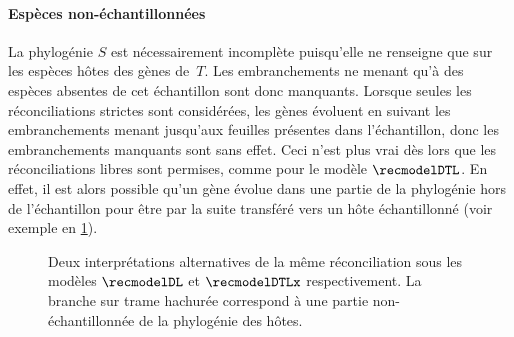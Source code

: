 {%

\paragraph{Espèces non-échantillonnées~\textup{\parencite{Szoelloesi2013LateralGeneTransfer,Weiner2021ImprovedDuplicationTransfer}}}
La phylogénie \(S\) est nécessairement incomplète puisqu’elle ne renseigne que sur les espèces hôtes des gènes de~\(T\).
Les embranchements ne menant qu’à des espèces absentes de cet échantillon sont donc manquants.
Lorsque seules les réconciliations strictes sont considérées, les gènes évoluent en suivant les embranchements menant jusqu’aux feuilles présentes dans l’échantillon, donc les embranchements manquants sont sans effet.
Ceci n’est plus vrai dès lors que les réconciliations libres sont permises, comme pour le modèle \(\recmodelDTL\).
En effet, il est alors possible qu’un gène évolue dans une partie de la phylogénie hors de l’échantillon pour être par la suite transféré vers un hôte échantillonné (voir exemple en \cref{figure:rec-dtlx}).

\begin{figure}[htb]
    \capstart
    \centering
    
    \caption{
        Deux interprétations alternatives de la même réconciliation sous les modèles \(\recmodelDL\) et \(\recmodelDTLx\) respectivement.
        La branche sur trame hachurée correspond à une partie non-échantillonnée de la phylogénie des hôtes.
    }
    \label{figure:rec-dtlx}
\end{figure}

}
